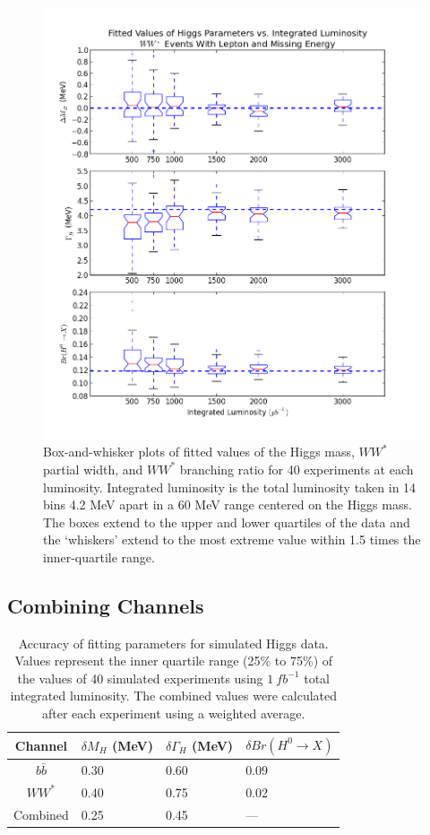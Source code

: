 \documentclass[a4paper]{article}
\begin{document}
\begin{figure}
	\includegraphics[width=\textwidth]{fitted-vals-boxpl-ww}
	\caption{Box-and-whisker plots of fitted values of the Higgs mass, $WW^*$ partial width, and $WW^*$ branching ratio for 40 experiments at each luminosity. Integrated luminosity is the total luminosity taken in 14 bins 4.2 MeV apart in a 60 MeV range centered on the Higgs mass. The boxes extend to the upper and lower quartiles of the data and the `whiskers' extend to the most extreme value within 1.5 times the inner-quartile range.\label{fig:fitted-vals-boxpl-ww}}
\end{figure}

\subsection{Combining Channels}
\begin{table}
	\begin{center}
		\begin{tabular}{|c|l|l|l|}
			\hline
			Channel	& $\delta M_H$ (MeV)	& $\delta \Gamma_H$ (MeV)	& $\delta Br(H^0\rightarrow X)$ \\ \hline
			$b\bar{b}$	& 0.30	& 0.60	& 0.09	\\ \hline
			$WW^*$		& 0.40	& 0.75	& 0.02	\\ \hline
			Combined	& 0.25	& 0.45	& ---	\\ \hline
		\end{tabular}
	\end{center}
	\caption{Accuracy of fitting parameters for simulated Higgs data. Values represent the inner quartile range (25\% to 75\%) of the values of 40 simulated experiments using $1~fb^{-1}$ total integrated luminosity. The combined values were calculated after each experiment using a weighted average.\label{table:fitted-vals-boxpl}}
\end{table}
\end{document}
